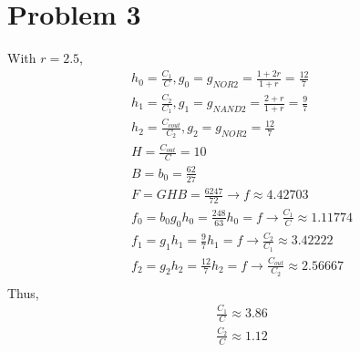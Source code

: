 \documentclass[a4paper,10pt]{article}
\begin{document}
\section*{Problem 3}
With \begin{math}r=2.5\end{math}, 
\begin{equation}
\begin{split}
&h_0=\frac{C_1}{C}, g_0=g_{NOR2}=\frac{1+2r}{1+r}=\frac{12}{7}\\
&h_1=\frac{C_2}{C_1}, g_1=g_{NAND2}=\frac{2+r}{1+r}=\frac{9}{7}\\
&h_2=\frac{C_{cout}}{C_2}, g_2=g_{NOR2}=\frac{12}{7}\\
&H=\frac{C_{out}}{C}=10\\
&B=b_0=\frac{62}{27}\\
&F=GHB=\frac{6247}{72}\rightarrow f\approx 4.42703\\
&f_0=b_0 g_0 h_0 = \frac{248}{63}h_0 =f\rightarrow \frac{C_1}{C}\approx 1.11774\\
&f_1=g_1 h_1 =\frac{9}{7}h_1 =f\rightarrow \frac{C_2}{C_1}\approx 3.42222\\
&f_2=g_2 h_2 =\frac{12}{7}h_2=f\rightarrow\frac{C_{out}}{C_2}\approx 2.56667\\
\end{split}
\end{equation}
Thus, 
\begin{equation}
 \begin{split}
  &\frac{C_1}{C}\approx 3.86\\
  &\frac{C_2}{C}\approx 1.12
 \end{split}
\end{equation}
\end{document}
